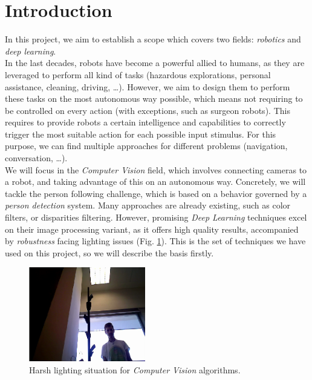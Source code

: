 \section{Introduction}
%
In this project, we aim to establish a scope which covers two fields: \emph{robotics} and \emph{deep learning}.\\

In the last decades, robots have become a powerful allied to humans, as they are leveraged to perform all kind of tasks (hazardous explorations, personal assistance, cleaning, driving, \dots). However, we aim to design them to perform these tasks on the most autonomous way possible, which means not requiring to be controlled on every action (with exceptions, such as surgeon robots). This requires to provide robots a certain intelligence and capabilities to correctly trigger the most suitable action for each possible input stimulus. For this purpose, we can find multiple approaches for different problems (navigation, conversation, \dots).\\

We will focus in the \emph{Computer Vision} field, which involves connecting cameras to a robot, and taking advantage of this on an autonomous way. Concretely, we will tackle the person following challenge, which is based on a behavior governed by a \emph{person detection} system. Many approaches are already existing, such as color filters, or disparities filtering. However, promising \emph{Deep Learning} techniques excel on their image processing variant, as it offers high quality results, accompanied by \emph{robustness} facing lighting issues (Fig. \ref{fig:intro_harsh_light}). This is the set of techniques we have used on this project, so we will describe the basis firstly.\\

\begin{figure}[h]
	\centering
	\includegraphics[width=2in]{images/light_ko_2}
	\caption{Harsh lighting situation for \emph{Computer Vision} algorithms.}
	\label{fig:intro_harsh_light}
\end{figure}


